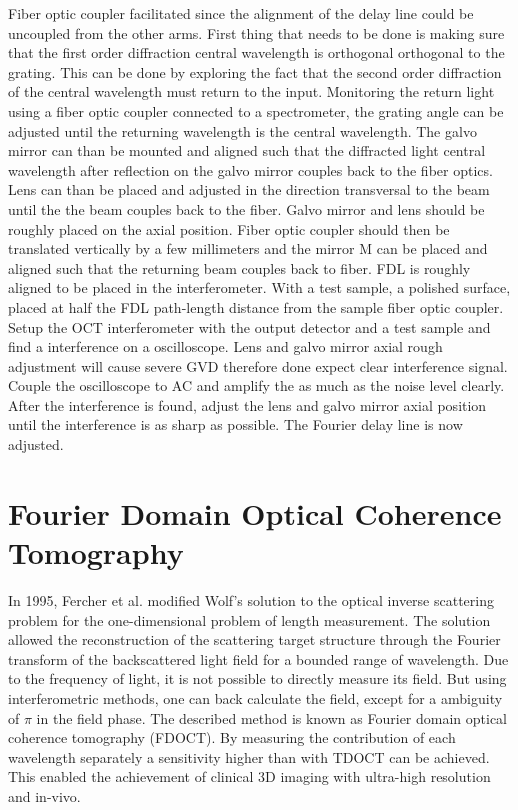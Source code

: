 \documentclass[12pt,twoside,english]{book}
\renewcommand{\~}{\perispomeni}%
\numberwithin{equation}{section}
\numberwithin{figure}{section}
\begin{document}
Fiber optic coupler facilitated since the alignment of the delay line could be uncoupled from the other arms. First thing that needs to be done is making sure that the first order diffraction central wavelength is orthogonal orthogonal to the grating. This can be done by exploring the fact that the second order diffraction of the central wavelength must return to the input. Monitoring the return light using a fiber optic coupler connected to a spectrometer, the grating angle can be adjusted until the returning wavelength is the central wavelength. The galvo mirror can than be mounted and aligned such that the diffracted light central wavelength after reflection on the galvo mirror couples back to the fiber optics. Lens can than be placed and adjusted in the direction transversal to the beam until the the beam couples back to the fiber. Galvo mirror and lens should be roughly placed on the axial position. Fiber optic coupler should then be translated vertically by a few millimeters and the mirror M can be placed and aligned such that the returning beam couples back to fiber. FDL is roughly aligned to be placed in the interferometer. With a test sample, a polished surface, placed at half the FDL path-length distance from the sample fiber optic coupler. Setup the OCT interferometer with the output detector and a test sample and find a interference on a oscilloscope. Lens and galvo mirror axial rough adjustment will cause severe GVD therefore done expect clear interference signal. Couple the oscilloscope to AC and amplify the as much as the noise level clearly. After the interference is found, adjust the lens and galvo mirror axial position until the interference is as sharp as possible. The Fourier delay line is now adjusted.


\chapter[Fourier Domain OCT]{Fourier Domain Optical Coherence Tomography}
\label{chapter:FDOCT}
In 1995, Fercher et al.\cite{Fercher:1995p1683} modified Wolf's solution to the optical inverse scattering problem for the one-dimensional problem of length measurement. The solution allowed the reconstruction of the scattering target structure through the Fourier transform of the backscattered light field for a bounded range of wavelength. Due to the frequency of light, it is not possible to directly measure its field. But using interferometric methods, one can back calculate the field, except for a ambiguity of $\pi$ in the field phase. The described method is known as Fourier domain optical coherence tomography (\gls{FDOCT}). By measuring the contribution of each wavelength separately a sensitivity higher than with \gls{TDOCT} can be achieved. This enabled the achievement of clinical 3D imaging with ultra-high resolution and in-vivo.
\end{document}
